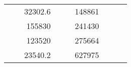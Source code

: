 \begin{table}[H]
\begin{tabular}{|ccrccrccc}
\multicolumn{1}{|c|}{\cellcolor[HTML]{FFFFC7}}                                & \multicolumn{1}{c|}{\cellcolor[HTML]{DDFDFF}}                      & \multicolumn{1}{r|}{\cellcolor[HTML]{DAE8FC}32302.6}   & \multicolumn{1}{c|}{\cellcolor[HTML]{FFFFC7}}                                & \multicolumn{1}{c|}{\cellcolor[HTML]{DDFDFF}}                       & \multicolumn{1}{r|}{\cellcolor[HTML]{DDFDFF}148861}    &                                                                              &                                                                    &                                                        \\ \cline{3-3} \cline{6-6}
\multicolumn{1}{|c|}{\cellcolor[HTML]{FFFFC7}}                                & \multicolumn{1}{c|}{\cellcolor[HTML]{DDFDFF}}                      & \multicolumn{1}{r|}{\cellcolor[HTML]{DDFDFF}155830}    & \multicolumn{1}{c|}{\cellcolor[HTML]{FFFFC7}}                                & \multicolumn{1}{c|}{\cellcolor[HTML]{DDFDFF}}                       & \multicolumn{1}{r|}{\cellcolor[HTML]{DAE8FC}241430}    &                                                                              &                                                                    &                                                        \\ \cline{3-3} \cline{6-6}
\multicolumn{1}{|c|}{\cellcolor[HTML]{FFFFC7}}                                & \multicolumn{1}{c|}{\cellcolor[HTML]{DDFDFF}}                      & \multicolumn{1}{r|}{\cellcolor[HTML]{DAE8FC}123520}    & \multicolumn{1}{c|}{\cellcolor[HTML]{FFFFC7}}                                & \multicolumn{1}{c|}{\cellcolor[HTML]{DDFDFF}}                       & \multicolumn{1}{r|}{\cellcolor[HTML]{DDFDFF}275664}    &                                                                              &                                                                    &                                                        \\ \cline{3-3} \cline{6-6}
\multicolumn{1}{|c|}{\cellcolor[HTML]{FFFFC7}}                                & \multicolumn{1}{c|}{\cellcolor[HTML]{DDFDFF}}                      & \multicolumn{1}{r|}{\cellcolor[HTML]{DDFDFF}23540.2}   & \multicolumn{1}{c|}{\cellcolor[HTML]{FFFFC7}}                                & \multicolumn{1}{c|}{\cellcolor[HTML]{DDFDFF}}                       & \multicolumn{1}{r|}{\cellcolor[HTML]{DAE8FC}627975}    &                                                                              &                                                                    &                                                        \\ \cline{3-3} \cline{6-6}

\end{tabular}
\end{table}

